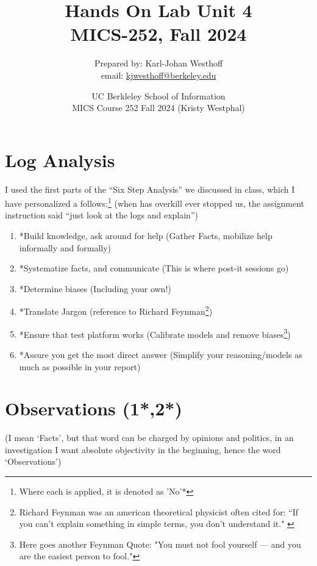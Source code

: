 \documentclass[
	letterpaper, %
	10pt, %
	unnumberedsections, %
	twoside, %
]{APAAssignment}
\title{Hands On Lab Unit 4 \\ MICS-252, Fall 2024} %
\date{UC Berkleley School of Information \\
MICS Course 252 Fall 2024 (Kristy Westphal)
}
\author{
	Prepared by: Karl-Johan Westhoff \\
	email: \href{mailto:kjwesthoff@berkeley.edu}{kjwesthoff@berkeley.edu}
}
\begin{document}
\onecolumn
\maketitle %



\section{Log Analysis}\label{log-analysis}

I used the first parts of the ``Six Step Analysis'' we discussed in class, which I have personalized a follows:\footnote{Where each is applied, it is denoted as 'No'*} (when has overkill ever stopped us, the assignment instruction said ``just look at the logs and explain'')
\begin{enumerate}
  \item *Build knowledge, ask around for help (Gather Facts, mobilize help informally and formally) 
  \item *Systematize facts, and communicate (This is where post-it sessions go) 
  \item *Determine biases (Including your own!) 
  \item *Translate Jargon (reference to Richard Feynman\footnote{Richard Feynman was an american theoretical physicist often cited for: “If you can't explain something in simple terms, you don't understand it."\cite{FeynmanMedium} \cite{FeynmanWikipedia}})
  \item *Ensure that test platform works (Calibrate models and remove biases\footnote{Here goes another Feynman Quote: "You must not fool yourself — and you are the easiest person to fool."\cite{FeynmanFoolOurselves}})
  \item *Assure you get the most direct answer (Simplify your reasoning/models as much as possible in your report)
\end{enumerate}


\section{Observations (1*,2*)}\label{observations}

(I mean `Facts', but that word can be charged by opinions and politics,
in an investigation I want absolute objectivity in the beginning, hence the word
`Observations') \\
\end{document}

